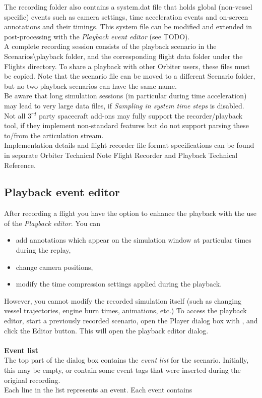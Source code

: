 \documentclass[Orbiter User Manual.tex]{subfiles}
\begin{document}
\noindent
The recording folder also contains a system.dat file that holds global (non-vessel specific) events such as camera settings, time acceleration events and on-screen annotations and their timings. This system file can be modified and extended in post-processing with the \textit{Playback event editor} (see TODO).\\
A complete recording session consists of the playback scenario in the Scenarios\textbackslash playback folder, and the corresponding flight data folder under the Flights directory. To share a playback with other Orbiter users, these files must be copied. Note that the scenario file can be moved to a different Scenario folder, but no two playback scenarios can have the same name.\\
Be aware that long simulation sessions (in particular during time acceleration) may lead to very large data files, if \textit{Sampling in system time steps} is disabled.\\
Not all 3$^{rd}$ party spacecraft add-ons may fully support the recorder/playback tool, if they implement non-standard features but do not support parsing these to/from the articulation stream.\\
Implementation details and flight recorder file format specifications can be found in separate Orbiter Technical Note Flight Recorder and Playback Technical Reference.


\subsection{Playback event editor}
After recording a flight you have the option to enhance the playback with the use of the \textit{Playback editor}. You can

\begin{itemize}
\item add annotations which appear on the simulation window at particular times during the replay,
\item change camera positions,
\item modify the time compression settings applied during the playback.
\end{itemize}

\noindent
However, you cannot modify the recorded simulation itself (such as changing vessel trajectories, engine burn times, animations, etc.) To access the playback editor, start a previously recorded scenario, open the Player dialog box with \Ctrl{}, and click the Editor button. This will open the playback editor dialog.\\
\\
\textbf{Event list}\\
The top part of the dialog box contains the \textit{event list} for the scenario. Initially, this may be empty, or contain some event tags that were inserted during the original recording.\\
Each line in the list represents an event. Each event contains
\end{document}
